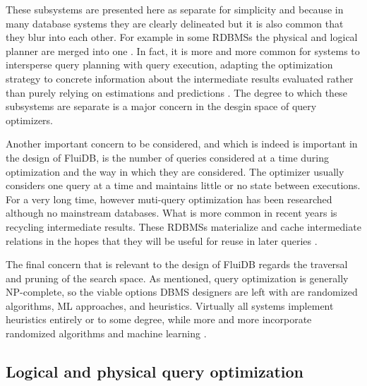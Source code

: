 These subsystems are presented here as separate for simplicity and
because in many database systems they are clearly delineated but it is
also common that they blur into each other. For example in some RDBMSs
the physical and logical planner are merged into one
\cite{graefeCascadesFrameworkQuery1995,shankarQueryOptimizationMicrosoft2012,solimanOrcaModularQuery2014}. In
fact, it is more and more common for systems to intersperse query
planning with query execution, adapting the optimization strategy
\cite{graefeDynamicQueryEvaluation1989} to concrete information about
the intermediate results evaluated rather than purely relying on
estimations and predictions
\cite{dingPlanStitchHarnessing2018,chaudhuriPayasyougoFrameworkQuery2008,wuSamplingbasedQueryReoptimization2016,herodotouXplusSqltuningawareQuery2010}. The
degree to which these subsystems are separate is a major concern in
the desgin space of query optimizers.

Another important concern to be considered, and which is indeed is
important in the design of FluiDB, is the number of queries considered
at a time during optimization and the way in which they are
considered. The optimizer usually considers one query at a time and
maintains little or no state between executions. For a very long time,
however muti-query optimization has been researched
\cite{michiardiCachebasedMultiqueryOptimization2021,wangMultiqueryOptimizationMapreduce2013,royEfficientExtensibleAlgorithms2000,rogersMultiqueryOptimization2017}
although no mainstream databases. What is more common in recent years
is recycling intermediate results. These RDBMSs materialize and cache
intermediate relations in the hopes that they will be useful for reuse
in later queries
\cite{perezHistoryawareQueryOptimization2014,nagelRecyclingPipelinedQuery2013,ivanovaArchitectureRecyclingIntermediates2010}.

The final concern that is relevant to the design of FluiDB regards the
traversal and pruning of the search space. As mentioned, query
optimization is generally NP-complete, so the viable options DBMS
designers are left with are randomized algorithms, ML approaches, and
heuristics. Virtually all systems implement heuristics entirely or to
some degree, while more and more incorporate randomized algorithms
\cite{chandeGeneticOptimizationJoin2011} and machine learning
\cite{liMachineLearningDatabases2021,marcusNeoLearnedQuery2019}.

\subsection{Logical and physical query optimization}
\label{sec:org86152ae}

